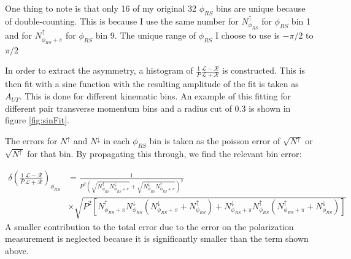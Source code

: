 \documentclass[letterpaper, abstract = on,listof=totoc, bibliography=totoc]{scrreprt}
\newcommand{\phirs}{\phi_{RS}}
\newcommand{\nup}{N^\uparrow}
\newcommand{\ndw}{N^\downarrow}
\begin{document}
One thing to note is that only 16 of my original 32 $\phi_{RS}$ bins are unique because of double-counting. This is because I use the same number for $N^\uparrow_{\phi_{RS}}$ for $\phi_{RS}$ bin 1 and for $N^\uparrow_{\phi_{RS}+\pi}$ for $\phi_{RS}$ bin 9. The unique range of $\phi_{RS}$ I choose to use is $-\pi/2$ to $\pi/2$

In order to extract the asymmetry, a histogram of $\frac{1}{P}\frac{\mathcal{L} - \mathcal{R}}{\mathcal{L} + \mathcal{R}}$ is constructed. This is then fit with a sine function with the resulting amplitude of the fit is taken as $A_{UT}$. This is done for different kinematic bins. An example of this fitting for different pair transverse momentum bins and a radius cut of 0.3 is shown in figure \ref{fig:sinFit}. 

The errors for $N^\uparrow$ and $N^\downarrow$ in each $\phirs$ bin is taken as the poisson error of $\sqrt{N^\uparrow}$ or $\sqrt{N^\uparrow}$ for that bin. By propagating this through, we find the relevant bin error:

\begin{align}
\delta\left(\frac{1}{P}\frac{\mathcal{L} - \mathcal{R}}{\mathcal{L} + \mathcal{R}}\right)_{\phirs} & = \frac{1}{P^2 \left(\sqrt{\nup_{\phirs} \ndw_{\phirs+\pi}} + \sqrt{\ndw_{\phirs}\nup_{\phirs + \pi}}\right)^2} \nonumber \\
& \times \sqrt{P^2\left[   \nup_{\phirs+\pi} \ndw_{\phirs} \left( \ndw_{\phirs+\pi} + \nup_{\phirs}\right) +  \ndw_{\phirs+\pi} \nup_{\phirs} \left( \nup_{\phirs+\pi} + \ndw_{\phirs}\right) \right]}
\label{eq:binError}
\end{align}
%
A smaller contribution to the total error due to the error on the polarization measurement is neglected because it is significantly smaller than the term shown above.
\end{document}
